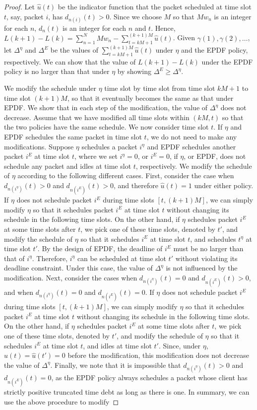 \documentclass[10pt,nocopyrightspace]{sigplan-proc-varsize-1in}
\begin{document}
\begin{proof}
Let $\hat{u}(t)$ be the indicator function that the packet scheduled at time slot $t$, say, packet $i$, has $d_{n(i)}(t)>0$. Since we choose $M$ so that $Mw_n$ is an integer for each $n$, $d_n(t)$ is an integer for each $n$ and $t$. Hence, $L(k+1)-L(k)=\sum_{n=1}^NMw_n-\sum_{t=kM+1}^{(k+1)M}\hat{u}(t)$. Given $\gamma(1),\gamma(2),\dots$, let $\Delta^\eta$ and $\Delta^E$ be the values of $\sum_{t=kM+1}^{(k+1)M}\hat{u}(t)$ under $\eta$ and the EPDF policy, respectively. We can show that the value of $L(k+1)-L(k)$ under the EPDF policy is no larger than that under $\eta$ by showing $\Delta^E\geq \Delta^\eta$.

We modify the schedule under $\eta$ time slot by time slot from time slot $kM+1$ to time slot $(k+1)M$, so that it eventually becomes the same as that under EPDF. We show that in each step of the modification, the value of $\Delta^\eta$ does not decrease. Assume that we have modified all time slots within $(kM,t)$ so that the two policies have the same schedule. We now consider time slot $t$. If $\eta$ and EPDF schedules the same packet in time slot $t$, we do not need to make any modifications. Suppose $\eta$ schedules a packet $i^\eta$ and EPDF schedules another packet $i^E$ at time slot $t$, where we set $i^\eta=0$, or $i^E=0$, if $\eta$, or EPDF, does not schedule any packet and idles at time slot $t$, respectively. We modify the schedule of $\eta$ according to the following different cases. First, consider the case when $d_{n(i^\eta)}(t)>0$ and $d_{n(i^E)}(t)>0$, and therefore $\hat{u}(t)=1$ under either policy. If $\eta$ does not schedule packet $i^E$ during time slots $[t,(k+1)M]$, we can simply modify $\eta$ so that it schedules packet $i^E$ at time slot $t$ without changing its schedule in the following time slots. On the other hand, if $\eta$ schedules packet $i^E$ at some time slots after $t$, we pick one of these time slots, denoted by $t'$, and modify the schedule of $\eta$ so that it schedules $i^E$ at time slot $t$, and schedules $t^\eta$ at time slot $t'$. By the design of EPDF, the deadline of $i^E$ must be no larger than that of $i^\eta$. Therefore, $i^\eta$ can be scheduled at time slot $t'$ without violating its deadline constraint. Under this case, the value of $\Delta^\eta$ is not influenced by the modification. Next, consider the cases when $d_{n(i^\eta)}(t)=0$ and $d_{n(i^E)}(t)>0$, and when $d_{n(i^\eta)}(t)=0$ and $d_{n(i^E)}(t)=0$. If $\eta$ does not schedule packet $i^E$ during time slots $[t,(k+1)M]$, we can simply modify $\eta$ so that it schedules packet $i^E$ at time slot $t$ without changing its schedule in the following time slots. On the other hand, if $\eta$ schedules packet $i^E$ at some time slots after $t$, we pick one of these time slots, denoted by $t'$, and modify the schedule of $\eta$ so that it schedules $i^E$ at time slot $t$, and idles at time slot $t'$. Since, under $\eta$, $\hat{u}(t)=\hat{u}(t')=0$ before the modification, this modification does not decrease the value of $\Delta^\eta$. Finally, we note that it is impossible that $d_{n(i^\eta)}(t)>0$ and $d_{n(i^E)}(t)=0$, as the EPDF policy always schedules a packet whose client has strictly positive truncated time debt as long as there is one. In summary, we can use the above procedure to modify 
\end{proof}
\end{document}
